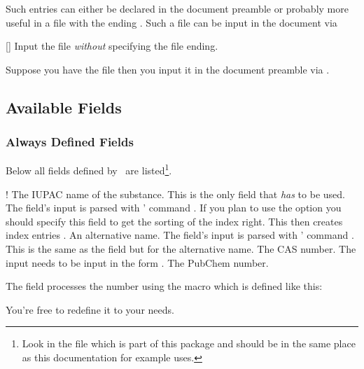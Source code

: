 \documentclass[load-preamble+]{cnltx-doc}
\begin{document}
Such entries can either be declared in the document preamble or probably
more useful in a file with the ending . Such a file can be input in
the document via
\begin{commands}
  []
    Input the file  \emph{without} specifying the file ending.
\end{commands}
Suppose you have the file  then you input it in the
document preamble via .

\subsection{Available Fields}
\subsubsection{Always Defined Fields}
Below all fields defined by \substances\ are listed\footnote{Look in the file
 which is part of this package and
should be in the same place as this documentation for example uses.}.
\begin{options}
  \Default!
    The \acs{IUPAC} name of the substance. This is the only field that
    \emph{has} to be used. The field's input is parsed with
    ' command .
    If you plan to use the  option you should specify this field
    to get the sorting of the index right. This then creates index entries
    .
    An alternative name. The field's input is parsed with '
    command .
    This is the same as the  field but for the alternative name.
    The \ac{CAS} number. The input needs to be input in the form
    .
    The PubChem number.
\end{options}

The  field processes the number using the macro
 which is defined like this:
\begin{sourcecode}
  \def\@CAS#1-#2-#3\relax{}
  \NewDocumentCommand{}
\end{sourcecode}
You're free to redefine it to your needs.
\end{document}
